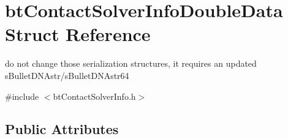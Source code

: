 \hypertarget{structbt_contact_solver_info_double_data}{\section{bt\+Contact\+Solver\+Info\+Double\+Data Struct Reference}
\label{structbt_contact_solver_info_double_data}
}


do not change those serialization structures, it requires an updated s\+Bullet\+D\+N\+Astr/s\+Bullet\+D\+N\+Astr64  




{\ttfamily \#include $<$bt\+Contact\+Solver\+Info.\+h$>$}

\subsection*{Public Attributes}
